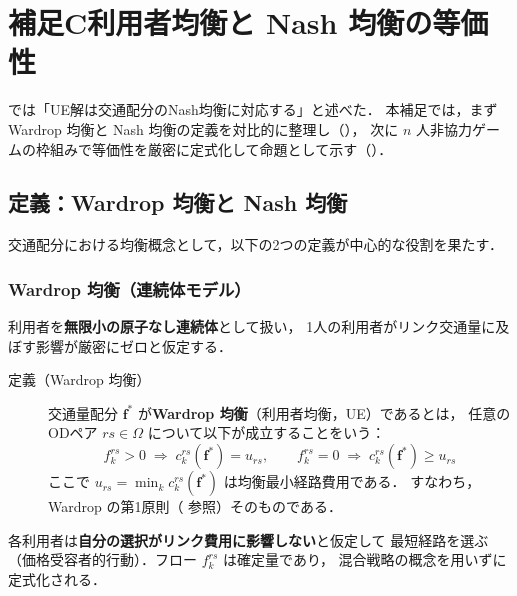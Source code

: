 \section{補足C\quad 利用者均衡と Nash 均衡の等価性}
\label{sec:appendix-C}

では「UE解は交通配分のNash均衡に対応する」と述べた．
本補足では，まず Wardrop 均衡と Nash 均衡の定義を対比的に整理し（），
次に $n$ 人非協力ゲームの枠組みで等価性を厳密に定式化して命題として示す（）\cite{Sheffi1985}．

\subsection{定義：Wardrop 均衡と Nash 均衡}
\label{subsec:appendix-C-definitions}

交通配分における均衡概念として，以下の2つの定義が中心的な役割を果たす．

\subsubsection*{Wardrop 均衡（連続体モデル）}

利用者を\textbf{無限小の原子なし連続体}として扱い，
1人の利用者がリンク交通量に及ぼす影響が厳密にゼロと仮定する．

\begin{description}
  \item[定義（Wardrop 均衡）\cite{Wardrop1952}]
    交通量配分 $\boldsymbol{f}^*$ が\textbf{Wardrop 均衡}（利用者均衡，UE）であるとは，
    任意の ODペア $rs \in \Omega$ について以下が成立することをいう：
    \begin{equation}
      f_k^{rs} > 0 \;\Rightarrow\; c_k^{rs}(\boldsymbol{f}^*) = u_{rs},
      \qquad
      f_k^{rs} = 0 \;\Rightarrow\; c_k^{rs}(\boldsymbol{f}^*) \geq u_{rs}
      \label{eq:appendix-C-wardrop-def}
    \end{equation}
    ここで $u_{rs} = \min_k c_k^{rs}(\boldsymbol{f}^*)$ は均衡最小経路費用である．
    すなわち，Wardrop の第1原則（ 参照）そのものである．
\end{description}

各利用者は\textbf{自分の選択がリンク費用に影響しない}と仮定して
最短経路を選ぶ（価格受容者的行動）．フロー $f_k^{rs}$ は確定量であり，
混合戦略の概念を用いずに定式化される．

